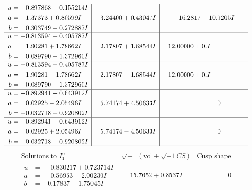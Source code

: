 \documentclass[1p]{elsarticle_modified}
\theoremstyle{definition}
\newcommand{\I}{\sqrt{-1}}
\begin{document}
$$\begin{array}{c|c|c}
\begin{aligned}
u &= \phantom{-}0.897868 - 0.155214 I \\
a &= \phantom{-}1.37373 + 0.80599 I \\
b &= \phantom{-}0.303749 - 0.272887 I\end{aligned}
 & -3.24400 + 0.43047 I & -16.2817 - 10.9205 I \\ \hline\begin{aligned}
u &= -0.813594 + 0.405787 I \\
a &= \phantom{-}1.90281 + 1.78662 I \\
b &= \phantom{-}0.089790 - 1.372960 I\end{aligned}
 & \phantom{-}2.17807 + 1.68544 I & -12.00000 + 0. I\phantom{ +0.000000I} \\ \hline\begin{aligned}
u &= -0.813594 - 0.405787 I \\
a &= \phantom{-}1.90281 - 1.78662 I \\
b &= \phantom{-}0.089790 + 1.372960 I\end{aligned}
 & \phantom{-}2.17807 - 1.68544 I & -12.00000 + 0. I\phantom{ +0.000000I} \\ \hline\begin{aligned}
u &= -0.892941 + 0.643912 I \\
a &= \phantom{-}0.02925 - 2.05496 I \\
b &= -0.032718 + 0.920802 I\end{aligned}
 & \phantom{-}5.74174 + 4.50633 I & \phantom{-0.000000 } 0 \\ \hline\begin{aligned}
u &= -0.892941 - 0.643912 I \\
a &= \phantom{-}0.02925 + 2.05496 I \\
b &= -0.032718 - 0.920802 I\end{aligned}
 & \phantom{-}5.74174 - 4.50633 I & \phantom{-0.000000 } 0\\
 \hline 
 \end{array}$$\newpage$$\begin{array}{c|c|c}  
\text{Solutions to }I^u_{1}& \I (\text{vol} + \sqrt{-1}CS) & \text{Cusp shape}\\
 \hline 
\begin{aligned}
u &= \phantom{-}0.830217 + 0.723714 I \\
a &= \phantom{-}0.56953 - 2.00230 I \\
b &= -0.17837 + 1.75045 I\end{aligned}
 & \phantom{-}15.7652 + 0.8537 I & \phantom{-0.000000 } 0 \\ \hline\begin{aligned}

\end{aligned}
\end{array}$$
\end{document}
